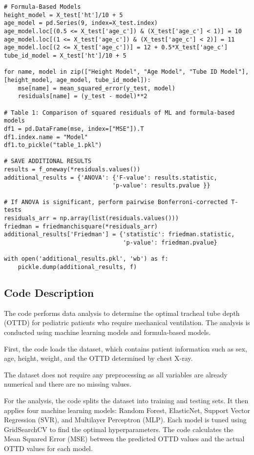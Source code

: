 \documentclass[11pt]{article}
\begin{document}
\begin{verbatim}
# Formula-Based Models
height_model = X_test['ht']/10 + 5
age_model = pd.Series(9, index=X_test.index)
age_model.loc[(0.5 <= X_test['age_c']) & (X_test['age_c'] < 1)] = 10
age_model.loc[(1 <= X_test['age_c']) & (X_test['age_c'] < 2)] = 11
age_model.loc[(2 <= X_test['age_c'])] = 12 + 0.5*X_test['age_c']
tube_id_model = X_test['ht']/10 + 5

for name, model in zip(["Height Model", "Age Model", "Tube ID Model"], [height_model, age_model, tube_id_model]):
    mse[name] = mean_squared_error(y_test, model)
    residuals[name] = (y_test - model)**2

# Table 1: Comparison of squared residuals of ML and formula-based models
df1 = pd.DataFrame(mse, index=["MSE"]).T
df1.index.name = "Model"
df1.to_pickle("table_1.pkl")

# SAVE ADDITIONAL RESULTS
results = f_oneway(*residuals.values())
additional_results = {'ANOVA': {'F-value': results.statistic,
                               'p-value': results.pvalue }}

# If ANOVA is significant, perform pairwise Bonferroni-corrected T-tests
residuals_arr = np.array(list(residuals.values()))
friedman = friedmanchisquare(*residuals_arr)
additional_results['Friedman'] = {'statistic': friedman.statistic,
                                  'p-value': friedman.pvalue}

with open('additional_results.pkl', 'wb') as f:
    pickle.dump(additional_results, f)

\end{verbatim}

\subsection{Code Description}

The code performs data analysis to determine the optimal tracheal tube depth (OTTD) for pediatric patients who require mechanical ventilation. The analysis is conducted using machine learning models and formula-based models.

First, the code loads the dataset, which contains patient information such as sex, age, height, weight, and the OTTD determined by chest X-ray.

The dataset does not require any preprocessing as all variables are already numerical and there are no missing values.

For the analysis, the code splits the dataset into training and testing sets. It then applies four machine learning models: Random Forest, ElasticNet, Support Vector Regression (SVR), and Multilayer Perceptron (MLP). Each model is tuned using GridSearchCV to find the optimal hyperparameters. The code calculates the Mean Squared Error (MSE) between the predicted OTTD values and the actual OTTD values for each model.
\end{document}
